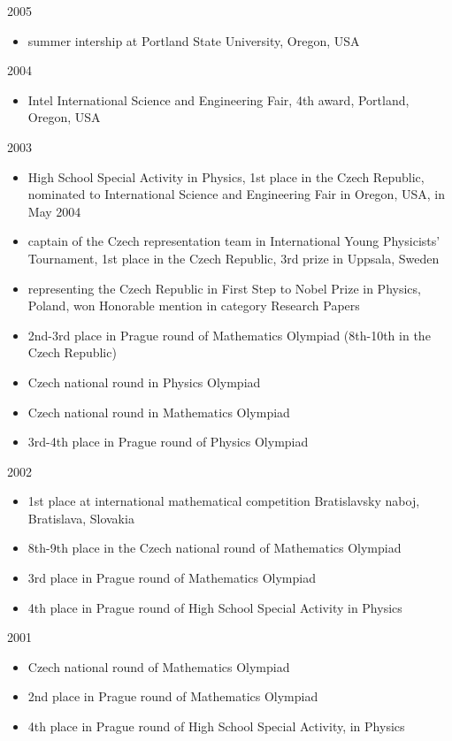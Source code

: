 \documentclass[a4paper,10pt]{article}
\newenvironment{packedenum}{
\begin{itemize}
  \setlength{\itemsep}{0pt}
  \setlength{\parskip}{0pt}
  \setlength{\parsep}{0pt}
}{\end{itemize}}
\begin{document}
{2005}
\begin{packedenum}
\item summer intership at Portland State University, Oregon, USA
\end{packedenum}

{2004}
\begin{packedenum}
\item Intel International Science and Engineering Fair, 4th award, Portland,
  Oregon, USA
\end{packedenum}

{2003}
\begin{packedenum}
\item High School Special Activity in Physics, 1st place in the Czech
  Republic, nominated to International Science and
  Engineering Fair in Oregon, USA, in May 2004
\item captain of the Czech representation team in International Young
  Physicists' Tournament, 1st place in the Czech Republic, 3rd prize in
  Uppsala, Sweden
\item representing the Czech Republic in First Step to Nobel Prize in
  Physics, Poland, won Honorable mention in category Research Papers
\item 2nd-3rd place in Prague round of Mathematics Olympiad (8th-10th in the
  Czech Republic)
\item Czech national round in Physics Olympiad
\item Czech national round in Mathematics Olympiad
\item 3rd-4th place in Prague round of Physics Olympiad
\end{packedenum}

{2002}
\begin{packedenum}
\item 1st place at international mathematical competition Bratislavsky naboj,
  Bratislava, Slovakia
\item 8th-9th place in the Czech national round of Mathematics Olympiad
\item 3rd place in Prague round of Mathematics Olympiad
\item 4th place in Prague round of High School Special Activity in Physics
\end{packedenum}

{2001}
\begin{packedenum}
\item Czech national round of Mathematics Olympiad
\item 2nd place in Prague round of Mathematics Olympiad
\item 4th place in Prague round of High School Special Activity, in Physics
\end{packedenum}
\end{document}
